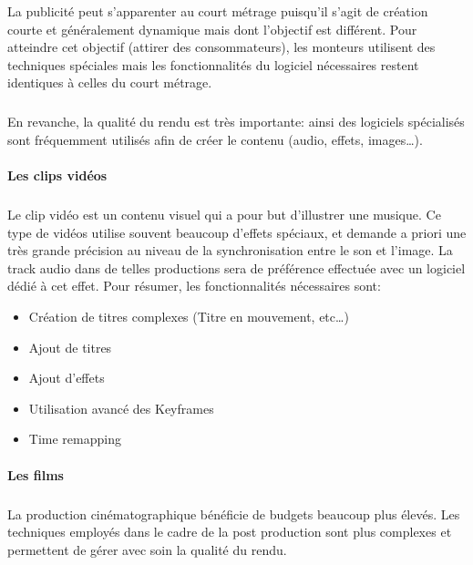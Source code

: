 La publicité peut s'apparenter au court métrage puisqu'il s'agit de
création courte et généralement dynamique mais dont l'objectif est
différent.  Pour atteindre cet objectif (attirer des consommateurs),
les monteurs utilisent des techniques spéciales mais les fonctionnalités
du logiciel nécessaires restent identiques à celles du court métrage.

\subparagraph{}

En revanche, la qualité du rendu est très importante: ainsi des
logiciels spécialisés sont fréquemment utilisés afin de créer le
contenu (audio, effets, images\ldots).

\paragraph {Les clips vidéos}

\subparagraph{}

Le clip vidéo est un contenu visuel qui a pour but d'illustrer une
musique. Ce type de vidéos utilise souvent beaucoup d'effets spéciaux,
et demande a priori une très grande précision au niveau de la
synchronisation entre le son et l'image. La track audio dans de telles
productions sera de préférence effectuée avec un logiciel dédié à
cet effet. Pour résumer, les fonctionnalités nécessaires sont:

\begin{itemize} \setlength{\itemsep}{2mm}

  \item{Création de titres complexes (Titre en mouvement, etc\ldots)}

  \item{Ajout de titres}

  \item{Ajout d'effets}

  \item{Utilisation avancé des Keyframes}

  \item{Time remapping}

\end{itemize}

\paragraph {Les films}

\subparagraph{}

La production cinématographique bénéficie de budgets beaucoup plus
élevés. Les techniques employés dans le cadre de la post production
sont plus complexes et permettent de gérer avec soin la qualité
du rendu.

